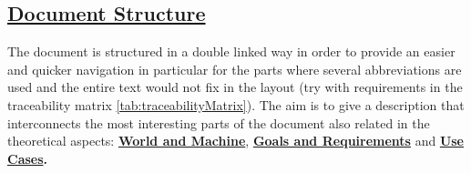 \subsection[Document Structure]{\hyperlink{toc}{Document Structure}}
	The document is structured in a double linked way in order to provide an easier and quicker navigation in particular for the parts where several abbreviations are used and the entire text would not fix in the layout (try with requirements in the traceability matrix \ref{tab:traceabilityMatrix}). The aim is to give a description that interconnects the most interesting parts of the document also related in the theoretical aspects: \textbf{\hyperref[sec:worldMachine]{World and Machine}},
	\textbf{\hyperref[sec:goalSatisfaction]{Goals and Requirements}}  and \textbf{\hyperref[sec:useCases]{Use Cases}.}\\
	
